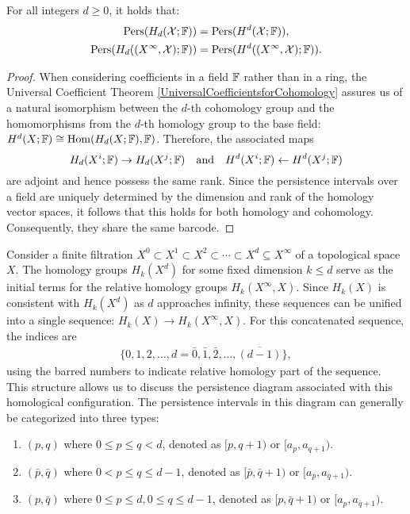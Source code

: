 \begin{theorem}{\cite[Proposition 2.3]{de2011dualities}}
For all integers $d \geq 0$, it holds that:
\begin{align}
\mathrm{Pers}(H_{d}(\mathcal{X};{\mathbb{F}})) &= \mathrm{Pers}(H^{d}(\mathcal{X};{\mathbb{F}})), \\
\mathrm{Pers}(H_{d}((X^{\infty}, \mathcal{X});{\mathbb{F}})) &= \mathrm{Pers}(H^{d}((X^{\infty}, \mathcal{X});{\mathbb{F}})).
\end{align}
\end{theorem}

\begin{proof}
When considering coefficients in a field ${\mathbb{F}}$ rather than in a ring, the Universal Coefficient Theorem \ref{UniversalCoefficientsforCohomology} assures us of a natural isomorphism between the $d$-th cohomology group and the homomorphisms from the $d$-th homology group to the base field: $H^{d}(X; {\mathbb{F}}) \cong \operatorname{Hom}(H_{d}(X; {\mathbb{F}}), {\mathbb{F}})$. Therefore, the associated maps
\begin{equation}
H_{d}(X^{i}; {\mathbb{F}}) \rightarrow H_{d}(X^{j}; {\mathbb{F}}) \quad \text{and} \quad H^{d}(X^{i}; {\mathbb{F}}) \leftarrow H^{d}(X^{j}; {\mathbb{F}})
\end{equation}
are adjoint and hence possess the same rank. Since the persistence intervals over a field are uniquely determined by the dimension and rank of the homology vector spaces, it follows that this holds for both homology and cohomology. Consequently, they share the same barcode.
\end{proof}

Consider a finite filtration $X^{0} \subset X^{1} \subset X^{2} \subset \cdots \subset X^d \subseteq X^{\infty}$ of a topological space $X$. The homology groups $H_{k}(X^{d})$ for some fixed dimension $k \leq d$ serve as the initial terms for the relative homology groups $H_{k}(X^{\infty}, X)$. Since $H_{k}(X)$ is consistent with $H_{k}(X^{d})$ as $d$ approaches infinity, these sequences can be unified into a single sequence: $H_{k}(X) \to H_{k}(X^{\infty}, X)$. For this concatenated sequence, the indices are 
\begin{align}
\{0, 1, 2, \ldots, d = \bar{0}, \bar{1}, \bar{2}, \ldots, \overline{(d-1)}\},
\end{align}
using the barred numbers to indicate relative homology part of the sequence. This structure allows us to discuss the persistence diagram associated with this homological configuration. The persistence intervals in this diagram can generally be categorized into three types:
\begin{enumerate}
	\item $(p, q)$ where $0 \leq p \leq q < d$, denoted as $[p, q+1)$ or $[a_{p}, a_{q+1})$.
	\item $(\bar{p}, \bar{q})$ where $0 < p \leq q \leq d-1$, denoted as $[\bar{p}, \bar{q}+1)$ or $[a_{\bar{p}}, a_{\bar{q}+1})$.
	\item $(p, \bar{q})$ where $0 \leq p \leq d, 0 \leq q \leq d-1$, denoted as $[p, \bar{q}+1)$ or $[a_{p}, a_{\bar{q}+1})$.
\end{enumerate}

